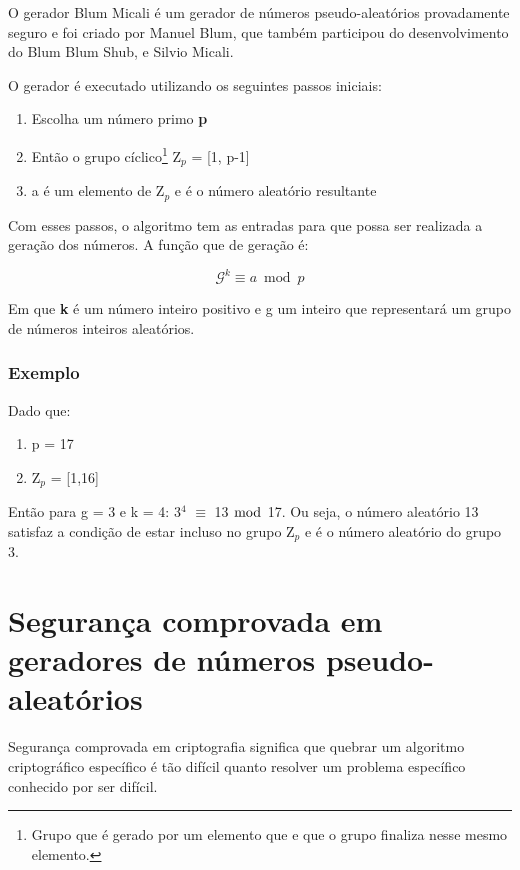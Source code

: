 O gerador Blum Micali é um gerador de números pseudo-aleatórios provadamente seguro e foi criado por Manuel Blum, que também participou do desenvolvimento do Blum Blum Shub, e Silvio Micali. ~\cite{josefin-martin}

O gerador é executado utilizando os seguintes passos iniciais:

\begin{enumerate}
	\item Escolha um número primo \textbf{p}
	\item Então o grupo cíclico\footnote{Grupo que é gerado por um elemento que e que o grupo finaliza nesse mesmo elemento.} Z$_p$ = [1, p-1]
	\item a é um elemento de Z$_p$ e é o número aleatório resultante
\end{enumerate}


Com esses passos, o algoritmo tem as entradas para que possa ser realizada a geração dos números. A função que de geração é:

\begin{equation}
	\mathcal{G}^k \equiv a \bmod p
\end{equation}

Em que \textbf{k} é um número inteiro positivo e g um inteiro que representará um grupo de números inteiros aleatórios.

\subsubsection{Exemplo}

Dado que:

\begin{enumerate}
	\item p = 17
	\item Z$_p$ = [1,16]
\end{enumerate}

Então para g = 3 e k = 4: 3$^4$ $\equiv$ 13 $\bmod$ 17. Ou seja, o número aleatório 13 satisfaz a condição de estar incluso no grupo Z$_p$ e é o número aleatório do grupo 3.

\section{Segurança comprovada em geradores de números pseudo-aleatórios}
\label{security-of-prng}

Segurança comprovada em criptografia significa que quebrar um algoritmo criptográfico específico é tão difícil quanto resolver um problema específico conhecido por ser difícil. ~\cite{josefin-martin}

